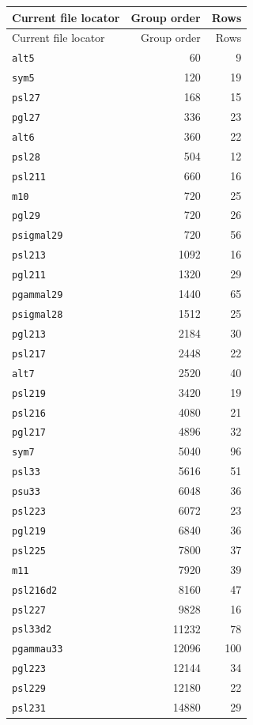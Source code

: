 \begin{longtable}{lrr}
\toprule Current file locator & Group order & Rows\\\midrule\endfirsthead
\toprule Current file locator & Group order & Rows\\\midrule\endhead
\texttt{alt5} & 60 & 9\\
\texttt{sym5} & 120 & 19\\
\texttt{psl27} & 168 & 15\\
\texttt{pgl27} & 336 & 23\\
\texttt{alt6} & 360 & 22\\
\texttt{psl28} & 504 & 12\\
\texttt{psl211} & 660 & 16\\
\texttt{m10} & 720 & 25\\
\texttt{pgl29} & 720 & 26\\
\texttt{psigmal29} & 720 & 56\\
\texttt{psl213} & 1092 & 16\\
\texttt{pgl211} & 1320 & 29\\
\texttt{pgammal29} & 1440 & 65\\
\texttt{psigmal28} & 1512 & 25\\
\texttt{pgl213} & 2184 & 30\\
\texttt{psl217} & 2448 & 22\\
\texttt{alt7} & 2520 & 40\\
\texttt{psl219} & 3420 & 19\\
\texttt{psl216} & 4080 & 21\\
\texttt{pgl217} & 4896 & 32\\
\texttt{sym7} & 5040 & 96\\
\texttt{psl33} & 5616 & 51\\
\texttt{psu33} & 6048 & 36\\
\texttt{psl223} & 6072 & 23\\
\texttt{pgl219} & 6840 & 36\\
\texttt{psl225} & 7800 & 37\\
\texttt{m11} & 7920 & 39\\
\texttt{psl216d2} & 8160 & 47\\
\texttt{psl227} & 9828 & 16\\
\texttt{psl33d2} & 11232 & 78\\
\texttt{pgammau33} & 12096 & 100\\
\texttt{pgl223} & 12144 & 34\\
\texttt{psl229} & 12180 & 22\\
\texttt{psl231} & 14880 & 29\\

\end{longtable}
